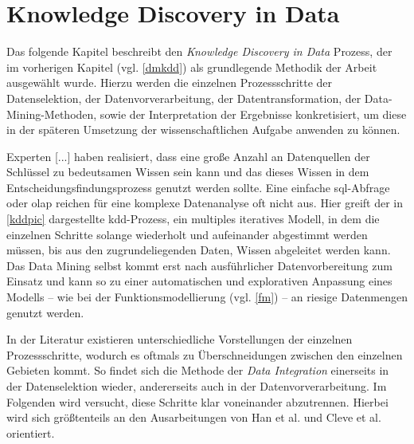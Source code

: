 \section{Knowledge Discovery in Data}
\label{kdd}

Das folgende Kapitel beschreibt den \textit{Knowledge Discovery in Data} Prozess, der im vorherigen Kapitel (vgl. \vref{dmkdd}) als grundlegende Methodik der Arbeit ausgewählt wurde. Hierzu werden die einzelnen Prozessschritte der Datenselektion, der Datenvorverarbeitung, der Datentransformation, der Data-Mining-Methoden, sowie der Interpretation der Ergebnisse konkretisiert, um diese in der späteren Umsetzung der wissenschaftlichen Aufgabe anwenden zu können.

\glqq Experten [...] haben realisiert, dass eine große Anzahl an Datenquellen der Schlüssel zu bedeutsamen Wissen sein kann und das dieses Wissen in dem Entscheidungsfindungsprozess genutzt werden sollte. Eine einfache \gls{sql}-Abfrage oder \gls{olap} reichen für eine komplexe Datenanalyse oft nicht aus.\grqq{} Hier greift der in \vref{kddpic} dargestellte \gls{kdd}-Prozess, ein multiples iteratives Modell, in dem die einzelnen Schritte solange wiederholt und aufeinander abgestimmt werden müssen, bis aus den zugrundeliegenden Daten, Wissen abgeleitet werden kann. Das Data Mining selbst kommt erst nach ausführlicher Datenvorbereitung zum Einsatz und kann so zu einer automatischen und explorativen Anpassung eines Modells -- wie bei der Funktionsmodellierung (vgl. \vref{fm}) -- an riesige Datenmengen genutzt werden.

In der Literatur existieren unterschiedliche Vorstellungen der einzelnen Prozessschritte, wodurch es oftmals zu Überschneidungen zwischen den einzelnen Gebieten kommt. So findet sich die Methode der \textit{Data Integration} einerseits in der Datenselektion wieder, andererseits auch in der Datenvorverarbeitung. Im Folgenden wird versucht, diese Schritte klar voneinander abzutrennen. Hierbei wird sich größtenteils an den Ausarbeitungen von Han et al. und Cleve et al. orientiert.


